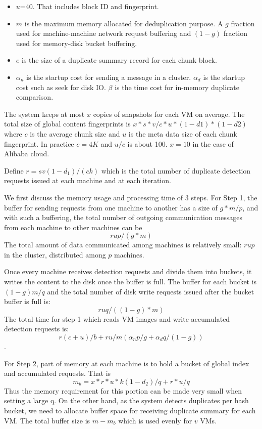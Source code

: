 {\begin{itemize}
\item $u$=40. That includes block ID and fingerprint.
\item $m$ is the maximum memory allocated for deduplication purpose.  A $g$ fraction used for 
machine-machine network  request buffering and $(1-g)$ fraction used for memory-disk bucket buffering.
\item $e$ is the size of a duplicate summary record for each chunk block.
\item $\alpha_n$ is the startup cost for sending a message in a cluster. $\alpha_d$ is the startup cost 
such as seek for disk IO. $\beta$ is the time cost for in-memory duplicate comparison.
\end{itemize}
The system keeps at most  $ x$ copies of snapshots for each VM on average.  The total size of  global content fingerprints is $x*s*v/c*u *(1-d1)*(1-d2)$ where $c$ is the average chunk size and $u$ is the meta data size of each chunk fingerprint. In practice $c=4K$ and $u/c$  is about 100.  $x=10$ in the case of Alibaba cloud.

Define $r = s v (1-d_1)/(ck)$  which is the total number of duplicate detection requests issued at each machine and at each iteration.

We first discuss the memory usage and processing time  of 3 steps. 
 For Step 1,  the buffer for sending requests from one machine to another has a size of  $g*m/p$, and with such a buffering, the total number of outgoing communication messages from  each machine to other machines  can be 
\[
r u p/(g*m)
\]
The total  amount of data communicated among machines is relatively small: $r u p$ in the cluster, distributed among $p$ machines.

Once every machine receives detection requests and divide them into buckets, it writes the content to the disk once the buffer is full. The buffer for each bucket is $(1-g)m/q$ and the total number of disk write requests issued after the bucket buffer is full is:
\[
r u q/((1-g)*m)
\]
The total time for step 1  which  reads VM images and write accumulated detection requests  is:   
\[
r  ( c+  u) /b   +r u /m (\alpha_n  p/g  + \alpha_d q/(1-g)  )
\].

For Step 2,  part of memory at each machine is  to hold  a bucket of global index and accumulated requests. That is
\[
m_b= x*r *u*k(1-d_2)/q + r*u/q
\]
Thus the memory requirement for this portion can be made very small when setting a large q. On the other hand, as the system detects duplicates per hash bucket, we need to allocate buffer space for receiving  duplicate summary for each VM.  The total buffer size is $m-m_b$ which is used evenly for $v$ VMs.

}
